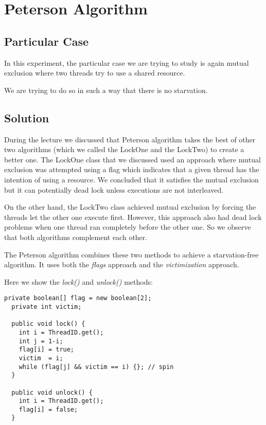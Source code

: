 \section{\textbf{Peterson Algorithm}}
\subsection{Particular Case}
\par
In this experiment, the particular case we are trying to study is again mutual
exclusion where two threads try to use a shared resource.
\par
We are trying to do so in such a way that there is no starvation.
\par
\subsection{Solution}
\par
During the lecture we discussed that Peterson algorithm takes the best of
other two algorithms (which we called the LockOne and the LockTwo) to create a
better one. The LockOne class that we discussed used an approach where mutual
exclusion was attempted using a flag which indicates that a given thread has the
intention of using a resource. We concluded that it satisfies the mutual
exclusion but it can potentially dead lock unless executions are not
interleaved.
\par
On the other hand, the LockTwo class achieved mutual exclusion by forcing the
threads let the other one execute first. However,  this approach also had dead
lock problems when one thread ran completely before the other one. So we observe
that both algorithms complement each other.
\par
 The Peterson algorithm combines these two methods to achieve a starvation-free
algorithm. It uses both the \textit{flags} approach and the
\textit{victimization} approach. 
\par
Here we show the \textit{lock()} and \textit{unlock()} methods:
\begin{lstlisting}[style=numbers]
  private boolean[] flag = new boolean[2];
  private int victim;

  public void lock() {
    int i = ThreadID.get();
    int j = 1-i;
    flag[i] = true;
    victim  = i;
    while (flag[j] && victim == i) {}; // spin
  }

  public void unlock() {
    int i = ThreadID.get();
    flag[i] = false; 
  }
\end{lstlisting}
\hfill
\par
